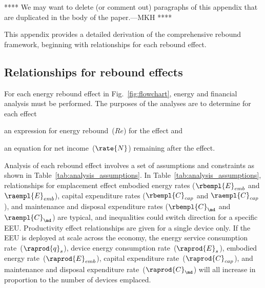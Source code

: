 

**** 
We may want to delete (or comment out)
paragraphs of this appendix that are duplicated
in the body of the paper.---MKH
****

This appendix provides a detailed derivation of the comprehensive rebound framework,
beginning with relationships for each rebound effect.


\subsection{Relationships for rebound effects}
\label{sec:relationships_for_stages}

For each energy rebound effect in Fig.~\ref{fig:flowchart},
energy and financial analysis must be performed.
The purposes of the analyses are to determine for each effect
%
\begin{enumerate*}[label={(\alph*)}]

  \item an expression for energy rebound~($Re$) for the effect and

  \item an equation for net income~($\rate{N}$) remaining after the effect.

\end{enumerate*}

Analysis of each rebound effect
involves a set of assumptions and constraints
as shown in Table~\ref{tab:analysis_assumptions}.
In Table~\ref{tab:analysis_assumptions}, 
relationships for emplacement effect 
embodied energy rates ($\rbempl{E}_{emb}$ and $\raempl{E}_{emb}$), 
capital expenditure rates ($\rbempl{C}_{cap}$ and $\raempl{C}_{cap}$), and 
maintenance and disposal expenditure rates ($\rbempl{C}_{\md}$ and $\raempl{C}_{\md}$)
are typical, and
inequalities could switch direction for a specific EEU.
Productivity effect relationships are given for a single device only.
If the EEU is deployed at scale across the economy, 
the energy service consumption rate~($\raprod{q}_s$), 
device energy consumption rate~($\raprod{E}_s$), 
embodied energy rate~($\raprod{E}_{emb}$),
capital expenditure rate~($\raprod{C}_{cap}$), and 
maintenance and disposal expenditure rate~($\raprod{C}_{\md}$)
will all increase in proportion to the number of devices emplaced.


